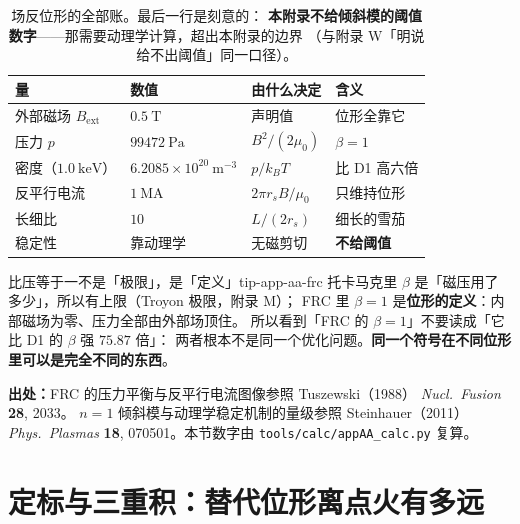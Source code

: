\begin{table}[htbp]
\centering
\small
\caption{场反位形的全部账。最后一行是刻意的：
\textbf{本附录不给倾斜模的阈值数字}——那需要动理学计算，超出本附录的边界
（与附录 W「明说给不出阈值」同一口径）。}
\label{tab:app-aa-frc}
\begin{tabular}{p{3.4cm}p{3.2cm}p{3.2cm}p{3.3cm}}
\toprule
量 & 数值 & 由什么决定 & 含义 \\
\midrule
外部磁场 $B_{\mathrm{ext}}$ & $0.5\ \mathrm{T}$ & 声明值 & 位形全靠它 \\
压力 $p$ & $99472\ \mathrm{Pa}$ & $B^2/(2\mu_0)$ & $\beta = 1$ \\
密度（$1.0\ \mathrm{keV}$） & $6.2085\times10^{20}\ \mathrm{m^{-3}}$ & $p/k_BT$ & 比 D1 高六倍 \\
反平行电流 & $1\ \mathrm{MA}$ & $2\pi r_sB/\mu_0$ & 只维持位形 \\
长细比 & $10$ & $L/(2r_s)$ & 细长的雪茄 \\
稳定性 & 靠动理学 & 无磁剪切 & \textbf{不给阈值} \\
\bottomrule
\end{tabular}

\end{table}

\begin{tip}{比压等于一不是「极限」，是「定义」}{tip-app-aa-frc}
托卡马克里 $\beta$ 是「磁压用了多少」，所以有上限（Troyon 极限，附录 M）；
FRC 里 $\beta=1$ 是\textbf{位形的定义}：内部磁场为零、压力全部由外部场顶住。
所以看到「FRC 的 $\beta=1$」不要读成「它比 D1 的 $\beta$ 强 $75.87$ 倍」：
两者根本不是同一个优化问题。\textbf{同一个符号在不同位形里可以是完全不同的东西}。
\end{tip}

{\footnotesize
\textbf{出处：}FRC 的压力平衡与反平行电流图像参照 Tuszewski（1988）
\emph{Nucl.\ Fusion} \textbf{28}, 2033。
$n=1$ 倾斜模与动理学稳定机制的量级参照
Steinhauer（2011）\emph{Phys.\ Plasmas} \textbf{18}, 070501。本节数字由
\texttt{tools/\allowbreak{}calc/\allowbreak{}appAA\_calc.py} 复算。
}

\section{定标与三重积：替代位形离点火有多远}
\label{sec:app-aa-scaling}

